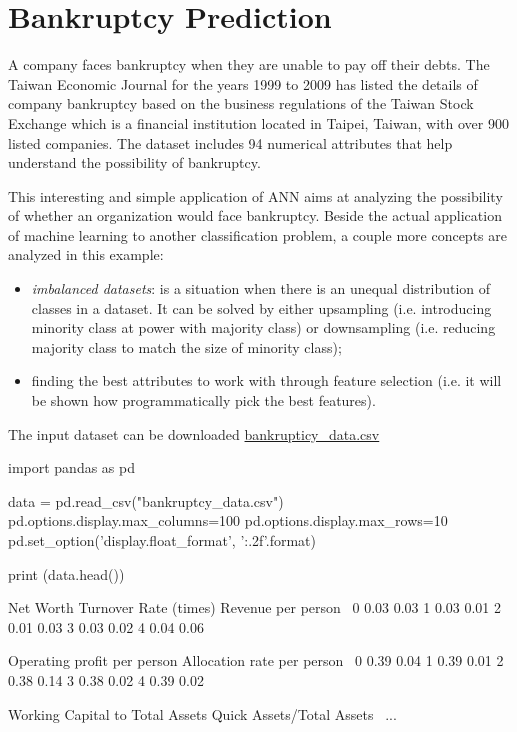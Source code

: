 \section{Bankruptcy Prediction}
A company faces bankruptcy when they are unable to pay off their debts. The Taiwan Economic Journal for the years 1999 to 2009 has listed the details of company bankruptcy based on the business regulations of the Taiwan Stock Exchange which is a financial institution located in Taipei, Taiwan, with over 900 listed companies. The dataset includes 94 numerical attributes that help understand the possibility of bankruptcy.

This interesting and simple application of ANN aims at analyzing the possibility of whether an organization would face bankruptcy. Beside the actual application of machine learning to another classification problem, a couple more concepts are analyzed in this example:
\begin{itemize}
\item \emph{imbalanced datasets}: is a situation when there is an unequal distribution of classes in a dataset. It can be solved by either upsampling (i.e. introducing minority class at power with majority class) or downsampling (i.e. reducing majority class to match the size of minority class);
\item finding the best attributes to work with through feature selection (i.e. it will be shown how programmatically pick the best features).
\end{itemize}

The input dataset can be downloaded \href{https://raw.githubusercontent.com/matteosan1/finance_course/develop/libro/input_files/bankrupticy_data.csv}{bankrupticy\_data.csv}
\begin{ipython}
import pandas as pd

data = pd.read_csv("bankruptcy_data.csv")
pd.options.display.max_columns=100
pd.options.display.max_rows=10
pd.set_option('display.float_format', '{:.2f}'.format)

print (data.head())
\end{ipython}
\begin{ioutput}
   Net Worth Turnover Rate (times)  Revenue per person  \
0                             0.03                0.03   
1                             0.03                0.01   
2                             0.01                0.03   
3                             0.03                0.02   
4                             0.04                0.06   

   Operating profit per person  Allocation rate per person  \
0                         0.39                        0.04   
1                         0.39                        0.01   
2                         0.38                        0.14   
3                         0.38                        0.02   
4                         0.39                        0.02   

   Working Capital to Total Assets  Quick Assets/Total Assets  \
...                        
\end{ioutput}

